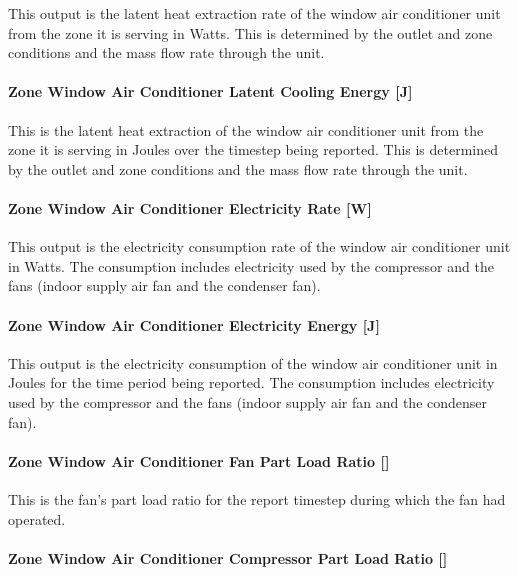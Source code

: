 This output is the latent heat extraction rate of the window air conditioner unit from the zone it is serving in Watts. This is determined by the outlet and zone conditions and the mass flow rate through the unit.

\paragraph{Zone Window Air Conditioner Latent Cooling Energy {[}J{]}}\label{zone-window-air-conditioner-latent-cooling-energy-j}

This is the latent heat extraction of the window air conditioner unit from the zone it is serving in Joules over the timestep being reported. This is determined by the outlet and zone conditions and the mass flow rate through the unit.

\paragraph{Zone Window Air Conditioner Electricity Rate {[}W{]}}\label{zone-window-air-conditioner-electric-powerw}

This output is the electricity consumption rate of the window air conditioner unit in Watts. The consumption includes electricity used by the compressor and the fans (indoor supply air fan and the condenser fan).

\paragraph{Zone Window Air Conditioner Electricity Energy {[}J{]}}\label{zone-window-air-conditioner-electric-energy-j}

This output is the electricity consumption of the window air conditioner unit in Joules for the time period being reported. The consumption includes electricity used by the compressor and the fans (indoor supply air fan and the condenser fan).

\paragraph{Zone Window Air Conditioner Fan Part Load Ratio {[]}}\label{zone-window-air-conditioner-fan-part-load-ratio}

This is the fan's part load ratio for the report timestep during which the fan had operated.

\paragraph{Zone Window Air Conditioner Compressor Part Load Ratio {[]}}\label{zone-window-air-conditioner-compressor-part-load-ratio}

